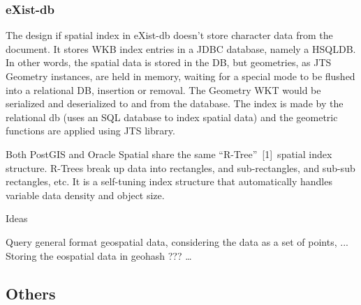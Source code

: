 \subsubsection{eXist-db}
The design if spatial index in eXist-db doesn't store character data from the document. It stores WKB index entries in a JDBC database, namely a HSQLDB. In other words, the spatial data is stored in the DB, but geometries, as JTS Geometry instances, are held in memory, waiting for a special mode to be flushed into a relational DB, insertion or removal. The Geometry WKT would be serialized and deserialized to and from the database.
The index is made by the relational db (uses an SQL database to index spatial data) and the geometric functions are applied using JTS library.



Both PostGIS and Oracle Spatial share the same “R-Tree” [1] spatial index structure. R-Trees break up data into rectangles, and sub-rectangles, and sub-sub rectangles, etc. It is a self-tuning index structure that automatically handles variable data density and object size.

Ideas

Query general format geospatial data, considering the data as a set of points, ...
Storing the eospatial data in geohash ???
…


\subsection{Others}
